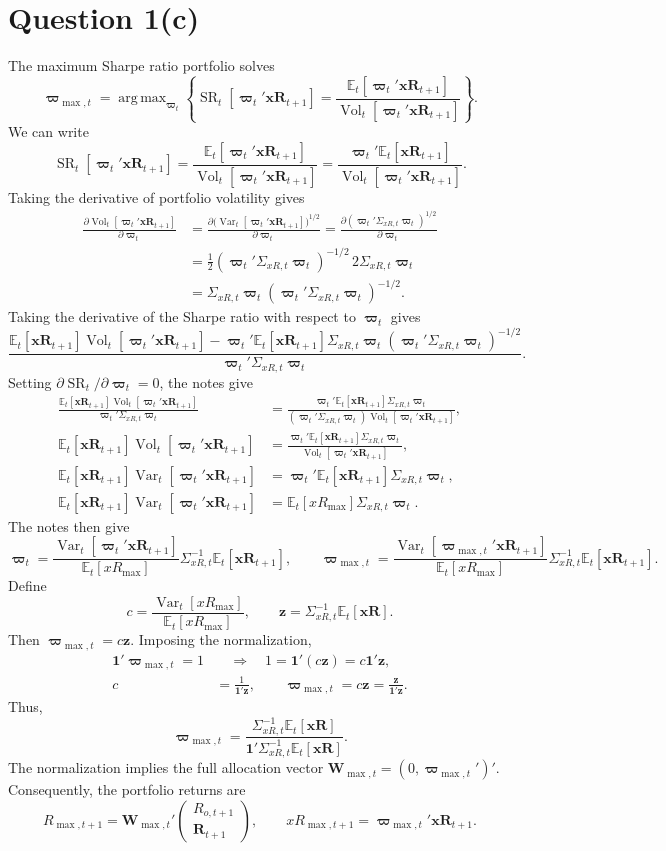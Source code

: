 \documentclass[11pt]{article}
\newcommand{\Et}{\mathbb{E}_t}
\newcommand{\Vt}{\operatorname{Var}_t}
\newcommand{\wt}{\boldsymbol{\varpi}_t}
\newcommand{\xr}{\mathbf{xR}_{t+1}}
\DeclareMathOperator*{\argmax}{arg\,max}
\begin{document}
\section*{Question 1(c)}
The maximum Sharpe ratio portfolio solves
\[
\boldsymbol{\varpi}_{\max,t}
=\argmax_{\wt}\left\{\operatorname{SR}_t[\wt'\xr]
=\frac{\Et[\wt'\xr]}{\operatorname{Vol}_t[\wt'\xr]}\right\}.
\]
We can write
\[
\operatorname{SR}_t[\wt'\xr]
=\frac{\Et[\wt'\xr]}{\operatorname{Vol}_t[\wt'\xr]}
=\frac{\wt'\Et[\xr]}{\operatorname{Vol}_t[\wt'\xr]}.
\]
Taking the derivative of portfolio volatility gives
\begin{align*}
\frac{\partial\operatorname{Vol}_t[\wt'\xr]}{\partial\wt}
&=\frac{\partial\bigl(\Vt[\wt'\xr]\bigr)^{1/2}}{\partial\wt}
=\frac{\partial(\wt'\Sigma_{xR,t}\wt)^{1/2}}{\partial\wt}\\
&=\frac12(\wt'\Sigma_{xR,t}\wt)^{-1/2}\,2\Sigma_{xR,t}\wt\\
&=\Sigma_{xR,t}\wt(\wt'\Sigma_{xR,t}\wt)^{-1/2}.
\end{align*}
Taking the derivative of the Sharpe ratio with respect to $\wt$ gives
\[
\frac{\Et[\xr]\operatorname{Vol}_t[\wt'\xr]
-\wt'\Et[\xr]\Sigma_{xR,t}\wt
(\wt'\Sigma_{xR,t}\wt)^{-1/2}}
{\wt'\Sigma_{xR,t}\wt}.
\]
Setting $\partial\operatorname{SR}_t/\partial\wt=0$, the notes give
\begin{align*}
\frac{\Et[\xr]\operatorname{Vol}_t[\wt'\xr]}
{\wt'\Sigma_{xR,t}\wt}
&=\frac{\wt'\Et[\xr]\Sigma_{xR,t}\wt}
{(\wt'\Sigma_{xR,t}\wt)\operatorname{Vol}_t[\wt'\xr]},\\
\Et[\xr]\operatorname{Vol}_t[\wt'\xr]
&=\frac{\wt'\Et[\xr]\Sigma_{xR,t}\wt}
{\operatorname{Vol}_t[\wt'\xr]},\\
\Et[\xr]\Vt[\wt'\xr]
&=\wt'\Et[\xr]\Sigma_{xR,t}\wt,\\
\Et[\xr]\Vt[\wt'\xr]
&=\Et[xR_{\max}]\Sigma_{xR,t}\wt.
\end{align*}
The notes then give
\[
\wt=\frac{\Vt[\wt'\xr]}{\Et[xR_{\max}]}
\Sigma_{xR,t}^{-1}\Et[\xr],
\qquad
\boldsymbol{\varpi}_{\max,t}
=\frac{\Vt[\boldsymbol{\varpi}_{\max,t}'\xr]}{\Et[xR_{\max}]}
\Sigma_{xR,t}^{-1}\Et[\xr].
\]
Define
\[
c=\frac{\Vt[xR_{\max}]}{\Et[xR_{\max}]},
\qquad \mathbf z=\Sigma_{xR,t}^{-1}\Et[\mathbf{xR}].
\]
Then $\boldsymbol{\varpi}_{\max,t}=c\mathbf z$. Imposing the normalization,
\begin{align*}
\mathbf1'\boldsymbol{\varpi}_{\max,t}=1
&\quad\Longrightarrow\quad
1=\mathbf1'(c\mathbf z)=c\mathbf1'\mathbf z,\\
c&=\frac1{\mathbf1'\mathbf z},\qquad
\boldsymbol{\varpi}_{\max,t}=c\mathbf z
=\frac{\mathbf z}{\mathbf1'\mathbf z}.
\end{align*}
Thus,
\[
\boxed{\boldsymbol{\varpi}_{\max,t}
=\frac{\Sigma_{xR,t}^{-1}\Et[\mathbf{xR}]}
{\mathbf1'\Sigma_{xR,t}^{-1}\Et[\mathbf{xR}]}.}
\]
The normalization implies the full allocation vector
$\mathbf W_{\max,t}=(0,\boldsymbol{\varpi}_{\max,t}')'$.
Consequently, the portfolio returns are
\[
R_{\max,t+1}=\mathbf W_{\max,t}'
\begin{pmatrix}R_{o,t+1}\\\mathbf R_{t+1}\end{pmatrix},
\qquad xR_{\max,t+1}=\boldsymbol{\varpi}_{\max,t}'\xr.
\]
\clearpage
\end{document}
